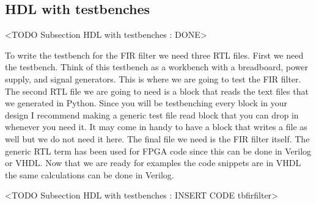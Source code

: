 	
\subsection{HDL with testbenches}
	<TODO Subsection HDL with testbenches : DONE>

To write the testbench for the \ac{FIR} filter we need three \ac{RTL} files. First we need the testbench. Think of this testbench as a workbench with a breadboard, power supply, and signal generators. This is where we are going to test the \ac{FIR} filter. The second \ac{RTL} file we are going to need is a block that reads the text files that we generated in Python. Since you will be testbenching every block in your design I recommend making a generic test file read block that you can drop in whenever you need it. It may come in handy to have a block that writes a file as well but we do not need it here. The final file we need is the \ac{FIR} filter itself. The generic \ac{RTL} term has been used for \ac{FPGA} code since this can be done in Verilog or \ac{VHDL}. Now that we are ready for examples the code snippets are in \ac{VHDL} the same calculations can be done in Verilog.

<TODO Subsection HDL with testbenches : INSERT CODE tbfirfilter>

